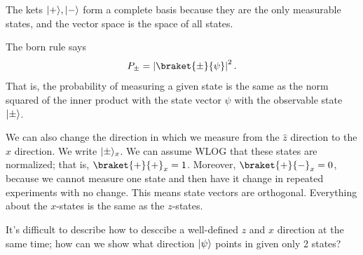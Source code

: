 
The kets $\lvert+\rangle, \lvert-\rangle$ form a complete basis because they are the only measurable states, and the vector space is the space of all states.

The born rule says
\[
	P_{\pm} = \left| \braket{\pm}{\psi } \right|^2
.\]
That is, the probability of measuring a given state is the same as the norm squared of the inner product with the state vector $\psi $ with the observable state $\lvert\pm\rangle$.

We can also change the direction in which we measure from the $\hat{z}$ direction to the $\hat{x} $ direction. We write $\lvert\pm\rangle_x$. We can assume WLOG that these states are normalized; that is, $\braket{+}{+}_x=1$. Moreover, $\braket{+}{-}_x=0$, because we cannot measure one state and then have it change in repeated experiments with no change. This means state vectors are orthogonal. Everything about the $x$-states is the same as the $z$-states.

It's difficult to describe how to desccibe a well-defined $z$ and $x$ direction at the same time; how can we show what direction $\lvert\psi \rangle$ points in given only 2 states?


